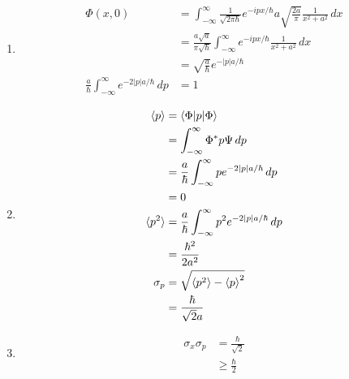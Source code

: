 \documentclass{article}
\begin{document}
\begin{enumerate}
  \item

        \begin{align*}
          \Phi(x, 0)                                                       & = \int_{-\infty}^\infty \frac{1}{\sqrt{2 \pi \hbar}} e^{-i p x / \hbar} a \sqrt{\frac{2 a}{\pi}} \frac{1}{x^2 + a^2} \,d x \\
                                                                           & = \frac{a \sqrt{a}}{\pi \sqrt{\hbar}} \int_{-\infty}^\infty e^{-i p x / \hbar} \frac{1}{x^2 + a^2} \,d x                   \\
                                                                           & = \sqrt{\frac{a}{\hbar}} e^{-|p| a / \hbar}                                                                                \\
          \frac{a}{\hbar} \int_{-\infty}^\infty e^{-2 |p| a / \hbar} \,d p & = 1
        \end{align*}

  \item

        \begin{align*}
          \braket{p}   & = \braket{\Phi | p | \Phi}                                             \\
                       & = \int_{-\infty}^\infty \Phi^* p \Psi \,d p                            \\
                       & = \frac{a}{\hbar} \int_{-\infty}^\infty p e^{-2 |p| a / \hbar} \,d p   \\
                       & = 0                                                                    \\
          \braket{p^2} & = \frac{a}{\hbar} \int_{-\infty}^\infty p^2 e^{-2 |p| a / \hbar} \,d p \\
                       & = \frac{\hbar^2}{2 a^2}                                                \\
          \sigma_p     & = \sqrt{\braket{p^2} - \braket{p}^2}                                   \\
                       & = \frac{\hbar}{\sqrt{2} a}
        \end{align*}

  \item

        \begin{align*}
          \sigma_x \sigma_p & = \frac{\hbar}{\sqrt{2}} \\
                            & \ge \frac{\hbar}{2}
        \end{align*}
\end{enumerate}
\end{document}
